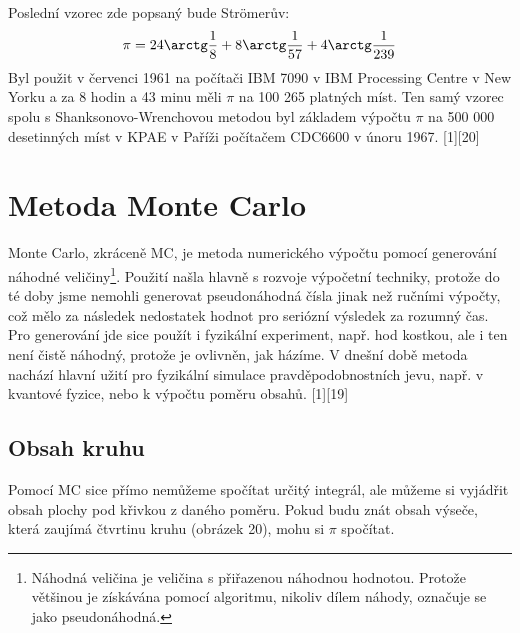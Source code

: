 \documentclass[soc]{gzwroc} %
\begin{document}
Poslední vzorec zde popsaný bude Strömerův:
\begin{equation}
\pi=24\arctg\frac{1}{8}+8\arctg\frac{1}{57}+4\arctg\frac{1}{239}
\end{equation}
Byl použit v červenci 1961 na počítači IBM 7090 v IBM Processing Centre v New Yorku a za 8 hodin a 43 minu měli $\pi$ na 100 265 platných míst. Ten samý vzorec spolu s Shanksonovo-Wrenchovou metodou byl základem výpočtu $\pi$ na 500 000 desetinných míst v KPAE v Paříži počítačem CDC6600 v únoru 1967. [1][20]
\section{Metoda Monte Carlo}
Monte Carlo, zkráceně MC, je metoda numerického výpočtu pomocí generování náhodné veličiny\footnote[9]{Náhodná veličina je veličina s přiřazenou náhodnou hodnotou. Protože většinou je získávána pomocí algoritmu, nikoliv dílem náhody, označuje se jako pseudonáhodná.}. Použití našla hlavně s rozvoje výpočetní techniky, protože do té doby jsme nemohli generovat pseudonáhodná čísla jinak než ručními výpočty, což mělo za následek nedostatek hodnot pro seriózní výsledek za rozumný čas. Pro generování jde sice použít i fyzikální experiment, např. hod kostkou, ale i ten není čistě náhodný, protože je ovlivněn, jak házíme. V dnešní době metoda nachází hlavní užití pro fyzikální simulace pravděpodobnostních jevu, např. v kvantové fyzice, nebo k výpočtu poměru obsahů. [1][19]
\subsection{Obsah kruhu}
Pomocí MC sice přímo nemůžeme spočítat určitý integrál, ale můžeme si vyjádřit obsah plochy pod křivkou z daného poměru. Pokud budu znát obsah výseče, která zaujímá čtvrtinu kruhu (obrázek 20), mohu si $\pi$ spočítat.
\end{document}
